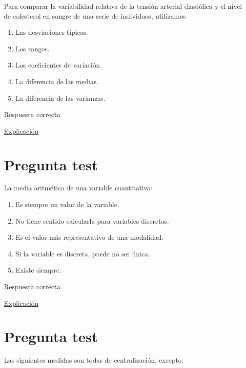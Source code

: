 \documentclass[
]{book}
\providecommand{\tightlist}{%
  \setlength{\itemsep}{0pt}\setlength{\parskip}{0pt}}
\begin{document}
Para comparar la variabilidad relativa de la tensión arterial diastólica y el nivel de colesterol en sangre de una serie de individuos, utilizamos

\begin{enumerate}
\def\labelenumi{\alph{enumi})}
\tightlist
\item
  Las desviaciones típicas.
\item
  Los rangos.
\item
  Los coeficientes de variación.
\item
  La diferencia de las medias.
\item
  La diferencia de las varianzas.
\end{enumerate}

Respuesta correcta

\href{https://1fjmanzano.github.io/bioestadistica/medidas-de-posicio\%CC\%81n-dispersio\%CC\%81n-y-forma.html}{Explicación}

\hypertarget{pregunta-test-50}{%
\section{Pregunta test}\label{pregunta-test-50}}

La media aritmética de una variable cuantitativa:

\begin{enumerate}
\def\labelenumi{\alph{enumi})}
\tightlist
\item
  Es siempre un valor de la variable.
\item
  No tiene sentido calcularla para variables discretas.
\item
  Es el valor más representativo de una modalidad.
\item
  Si la variable es discreta, puede no ser única.
\item
  Existe siempre.
\end{enumerate}

Respuesta correcta

\href{https://1fjmanzano.github.io/bioestadistica/medidas-de-posicio\%CC\%81n-dispersio\%CC\%81n-y-forma.html\#medidas-de-posicio\%CC\%81n-centrales}{Explicación}

\hypertarget{pregunta-test-51}{%
\section{Pregunta test}\label{pregunta-test-51}}

Las siguientes medidas son todas de centralización, excepto:
\end{document}
